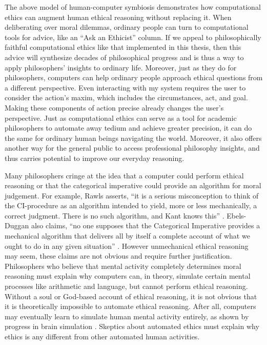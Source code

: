 \begin{isabellebody}
\begin{isamarkuptext}
The above model of human-computer symbiosis demonstrates how computational ethics can augment human
ethical reasoning without replacing it. When deliberating over moral dilemmas, ordinary people can 
turn to computational tools for advice, like an ``Ask an Ethicist'' column. If we appeal to philosophically
faithful computational ethics like that implemented in this thesis, then this advice will synthesize 
decades of philosophical progress and is thus a way to apply philosophers' insights to ordinary life. 
Moreover, just as they do for philosophers, computers can help ordinary people approach ethical questions from a 
different perspective. Even interacting with my system requires the user to consider the action's maxim, 
which includes the circumstances, act, and goal. Making these components of action precise already changes
the user's perspective. Just as computational ethics can serve as a tool for academic philosophers to 
automate away tedium and achieve greater precision, it can do the same for ordinary human beings navigating
the world. Moreover, it also offers another way for the general public to access professional philosophy
insights, and thus carries potential to improve our everyday reasoning.%
\end{isamarkuptext}\isamarkuptrue%
%
\isadelimdocument
%
\endisadelimdocument
%
\isatagdocument
%
\isamarkuptrue%
%
\endisatagdocument
{\isafolddocument}%
%
\isadelimdocument
%
\endisadelimdocument
%
\begin{isamarkuptext}%
Many philosophers cringe at the idea that a computer could perform ethical reasoning or that the 
categorical imperative could provide an algorithm for moral judgement. For example, Rawls asserts, 
``it is a serious misconception to think of the CI-procedure as an algorithm intended to yield, 
more or less mechanically, a correct judgment. There is no such algorithm, and Kant knows this'' \citep[166]{rawlslectures}. 
Ebels-Duggan also claims, ``no one supposes that the Categorical Imperative provides a mechanical 
algorithm that delivers all by itself a complete account of what we ought to do in any given 
situation'' \citep[174]{ebelsduggan}. However unmechanical ethical reasoning
may seem, these claims are not obvious and require further justification. Philosophers who believe 
that mental activity completely determines moral reasoning must explain why computers can, in theory, 
simulate certain mental processes like arithmetic and language, but cannot perform ethical reasoning. 
Without a soul or God-based account of ethical reasoning, it is not obvious that it is theoretically 
impossible to automate ethical reasoning. After all, computers may eventually learn to simulate human 
mental activity entirely, as shown by progress in brain simulation \citep{brainsimulation}. Skeptics
about automated ethics must explain why ethics is any different from other automated human activities.


\end{isamarkuptext}
\end{isabellebody}

